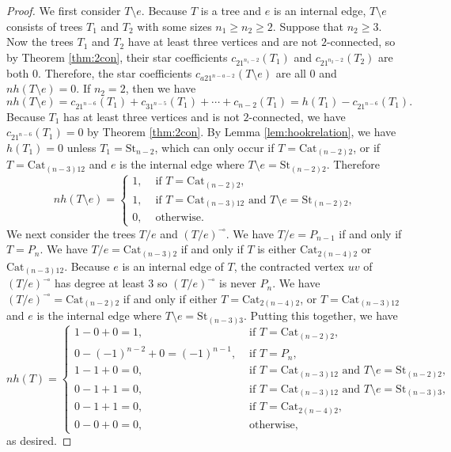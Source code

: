 \documentclass[12pt]{amsart}  %
\theoremstyle{definition}
\theoremstyle{remark}
\numberwithin{equation}{section}
\begin{document}
\begin{proof}
We first consider $T\setminus e$. Because $T$ is a tree and $e$ is an internal edge, $T\setminus e$ consists of trees $T_1$ and $T_2$ with some sizes $n_1\geq n_2\geq 2$. Suppose that $n_2\geq 3$. Now the trees $T_1$ and $T_2$ have at least three vertices and are not $2$-connected, so by Theorem \ref{thm:2con}, their star coefficients $c_{21^{n_1-2}}(T_1)$ and $c_{21^{n_2-2}}(T_2)$ are both $0$. Therefore, the star coefficients $c_{a21^{n-a-2}}(T\setminus e)$ are all $0$ and $nh(T\setminus e)=0$. If $n_2=2$, then we have
\begin{equation}
nh(T\setminus e)=c_{21^{n-6}}(T_1)+c_{31^{n-5}}(T_1)+\cdots+c_{n-2}(T_1)=h(T_1)-c_{21^{n-6}}(T_1).
\end{equation}
Because $T_1$ has at least three vertices and is not $2$-connected, we have $c_{21^{n-6}}(T_1)=0$ by Theorem \ref{thm:2con}. By Lemma \ref{lem:hookrelation}, we have $h(T_1)=0$ unless $T_1=\text{St}_{n-2}$, which can only occur if $T=\text{Cat}_{(n-2)2}$, or if $T=\text{Cat}_{(n-3)12}$ and $e$ is the internal edge where $T\setminus e=\text{St}_{(n-2)2}$. Therefore
\begin{equation}
nh(T\setminus e)=\begin{cases}
1,&\text{ if }T=\text{Cat}_{(n-2)2},\\
1,&\text{ if }T=\text{Cat}_{(n-3)12}\text{ and }T\setminus e=\text{St}_{(n-2)2},\\
0,&\text{ otherwise.}
\end{cases}
\end{equation}
We next consider the trees $T/e$ and $(T/e)^\multimap$. We have $T/e=P_{n-1}$ if and only if $T=P_n$. We have $T/e=\text{Cat}_{(n-3)2}$ if and only if $T$ is either $\text{Cat}_{2(n-4)2}$ or $\text{Cat}_{(n-3)12}$. Because $e$ is an internal edge of $T$, the contracted vertex $uv$ of $(T/e)^\multimap$ has degree at least $3$ so $(T/e)^\multimap$ is never $P_n$. We have $(T/e)^\multimap=\text{Cat}_{(n-2)2}$ if and only if either $T=\text{Cat}_{2(n-4)2}$, or $T=\text{Cat}_{(n-3)12}$ and $e$ is the internal edge where $T\setminus e=\text{St}_{(n-3)3}$. Putting this together, we have
\begin{equation}
nh(T)=\begin{cases}
1-0+0=1,&\text{ if }T=\text{Cat}_{(n-2)2},\\
0-(-1)^{n-2}+0=(-1)^{n-1},&\text{ if }T=P_n,\\
1-1+0=0,&\text{ if }T=\text{Cat}_{(n-3)12}\text{ and }T\setminus e=\text{St}_{(n-2)2},\\
0-1+1=0,&\text{ if }T=\text{Cat}_{(n-3)12}\text{ and }T\setminus e=\text{St}_{(n-3)3},\\
0-1+1=0,&\text{ if }T=\text{Cat}_{2(n-4)2},\\
0-0+0=0,&\text{ otherwise,}
\end{cases}
\end{equation}
as desired.
\end{proof}
\end{document}
